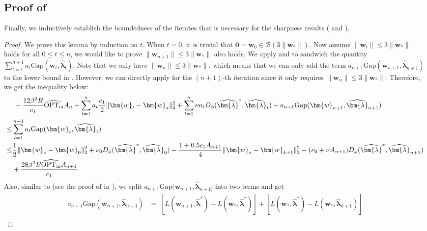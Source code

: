 \documentclass[11pt]{article}
\numberwithin{thm}{section}
\theoremstyle{plain}
\theoremstyle{definition}
\theoremstyle{remark} \newtheorem{remark}[thm]{Remark}
\def\vzero{{\bm{0}}}
\def\vlambda{{\bm{\lambda}}}
\def\vw{{\bm{w}}}
\def\cB{{\mathcal{B}}}
\newcommand{\Gap}{\mathrm{Gap}}
\newcommand{\evlambda}{\widehat{\vlambda}}
\DeclareMathOperator{\mOPT}{OPT_m}
\newcommand{\mOPThat}{\widehat{\mOPT}}
\begin{document}
\subsection{Proof of }\label{sec: restate-of-iteration-norm-ub}
Finally, we inductively establish the boundedness of the iterates that is necessary for the sharpness results ( and ).

\claimiterub*

\begin{proof}
We prove this lemma by induction on $t$. When \(t=0\), it is trivial that \(\vzero=\vw_0\in \cB(3\|\vw_*\|)\). Now assume \(\|\vw_t\|\le 3\|\vw_*\|\) holds for all \(0\le t \le n\), we would like to prove \(\|\vw_{n+1}\|\le 3\|\vw_*\|\) also holds. We apply  and  to sandwich the quantity \(\sum_{t=1}^{n+1}a_t\Gap(\vw_t,\evlambda_t)\). Note that we only have \(\|\vw_{n}\|\le 3\|\vw_*\|\), which means that we can only add the term \(a_{n+1}\Gap(\vw_{n+1},\evlambda_{n+1})\) to the lower bound in . However, we can directly apply  for the \((n+1)\)-th iteration since it only requires \(\|\vw_n\|\le 3\|\vw_*\|\). Therefore, we get the inequality below:
    \begin{align}\label{eq:sandwitch}
          & \; -\frac{12\beta^2 {B}}{c_1}\mOPThat A_{n} +  \sum_{t=1}^n a_{t}\frac{c_1}{2} \|\vw_{t} - \vw_*\|_{2}^{2} +  \sum_{t=1}^n \nu a_{t}D_{\phi}(\evlambda^*,\evlambda_{t})  + a_{n+1} \Gap(\vw_{n+1}, \evlambda_{n+1})\notag\\ 
          \le & \sum_{t=1}^{n+1} a_t \Gap(\vw_t, \evlambda_t)\notag \\
            \leq & \frac{1}{2}\|\vw_* - \vw_0\|_2^2 + \nu_0 D_\phi(\evlambda^*, \evlambda_0)
             - \frac{1 + 0.5 c_1A_{n+1}}{4}\|\vw_* - \vw_{k+1}\|_2^2 - (\nu_0 + \nu A_{n+1})D_\phi(\evlambda^*, \evlambda_{n+1})\notag\\ 
             &+ \frac{28 \beta^2 B\mOPThat A_{n+1}}{c_1}. 
    \end{align}
Also, similar to  (see the proof of  in ), we split \(a_{n+1}\Gap(\vw_{n+1},\evlambda_{n+1)}\) into two terms and get
    \begin{align*}
        a_{n+1}\Gap(\vw_{n+1},\evlambda_{n+1})&=\;[L(\vw_{n+1},\evlambda^*)-L(\vw_*,\evlambda^*)]+[L(\vw_*,\evlambda^*)-L(\vw_*,\evlambda_{n+1})] \\

\end{align*}
\end{proof}
\end{document}
